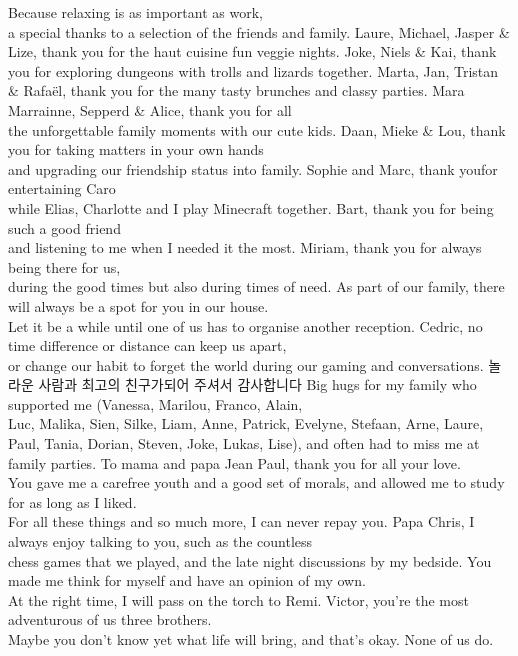 Because relaxing is as important as work,\\a special thanks to a selection of the friends and family.
Laure, Michael, Jasper \& Lize, thank you for the haut cuisine fun veggie nights.
Joke, Niels \& Kai, thank you for exploring dungeons with trolls and lizards together.
Marta, Jan, Tristan \& Rafaël, thank you for the many tasty brunches and classy parties.
Mara Marrainne, Sepperd \& Alice, thank you for all\\the unforgettable family moments with our cute kids.
Daan, Mieke \& Lou, thank you for taking matters in your own hands\\and upgrading our friendship status into family.
Sophie and Marc, thank youfor entertaining Caro\\while Elias, Charlotte and I play Minecraft together. 
Bart, thank you for being such a good friend\\and listening to me when I needed it the most.
Miriam, thank you for always being there for us,\\during the good times but also during times of need.
As part of our family, there will always be a spot for you in our house.\\Let it be a while until one of us has to organise another reception.
Cedric, no time difference or distance can keep us apart,\\or change our habit to forget the world during our gaming and conversations. 
놀라운 사람과 최고의 친구가되어 주셔서 감사합니다
Big hugs for my family who supported me (Vanessa, Marilou, Franco, Alain,\\Luc, Malika, Sien, Silke, Liam, Anne, Patrick, Evelyne, Stefaan, Arne, Laure, 
Paul, Tania, Dorian, Steven, Joke, Lukas, Lise), and often had to miss me at family parties.
To mama and papa Jean Paul, thank you for all your love.\\You gave me a carefree youth and a good set of morals,
and allowed me to study for as long as I liked.\\For all these things and so much more, I can never repay you.
Papa Chris, I always enjoy talking to you, such as the countless\\chess games that we played, and the late night discussions by my bedside.
You made me think for myself and have an opinion of my own.\\At the right time, I will pass on the torch to Remi.
Victor, you're the most adventurous of us three brothers.\\Maybe you don't know yet what life will bring, and that's okay. None of us do.
